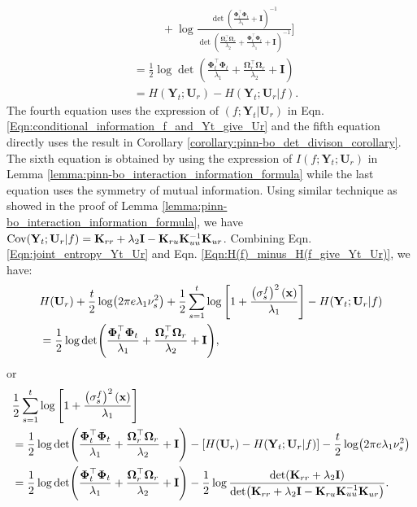 \begin{align}
\\ 
        & \;\;\; \;\;\; \;\;\;  + \log \frac{\det\left(\frac{\boldsymbol{\Phi}_t^\top \boldsymbol{\Phi}_t}{\lambda_1} + \mathbf{I}\right)^{-1}}{\det \left(\frac{\boldsymbol{\Omega}_r^\top\boldsymbol{\Omega}_r}{\lambda_2}+\frac{\boldsymbol{\Phi}_t^\top \boldsymbol{\Phi}_t} {\lambda_1} + \mathbf{I}\right)^{-1}} \Bigg] \nonumber
\\
        &=\frac{1}{2}\log \det(\frac{\boldsymbol{\Phi}_t^\top \boldsymbol{\Phi}_t}{\lambda_1} + \frac{\boldsymbol{\Omega}_r^\top \boldsymbol{\Omega}_r}{\lambda_2} + \mathbf{I}) \label{Eqn:H(f)_minus_H(f_give_Yt_Ur)}
\\
        &=
        H(\mathbf{Y}_t; \mathbf{U}_r) - H(\mathbf{Y}_t; \mathbf{U}_r \rvert f).  \nonumber
    \end{align} 
    The fourth equation uses the expression of $(f;\mathbf{Y}_t\rvert\mathbf{U}_r)$ in Eqn. \eqref{Eqn:conditional_information_f_and_Yt_give_Ur} and the fifth equation directly uses the result in Corollary \ref{corollary:pinn-bo_det_divison_corollary}.
    The sixth equation is obtained by using the expression of $I(f;\mathbf{Y}_t; \mathbf{U}_r)$  in Lemma \ref{lemma:pinn-bo_interaction_information_formula} while the last equation uses the symmetry of mutual information.
    Using similar technique as showed in the proof of Lemma \ref{lemma:pinn-bo_interaction_information_formula}, we have $\textup{Cov}(\mathbf{Y}_t; \mathbf{U}_r \rvert f) = \mathbf{K}_{rr} + \lambda_2 \mathbf{I} -  \mathbf{K}_{ru} \mathbf{K}_{uu}^{-1} \mathbf{K}_{ur}$. Combining Eqn. \eqref{Eqn:joint_entropy_Yt_Ur} and Eqn. \eqref{Eqn:H(f)_minus_H(f_give_Yt_Ur)}, we have: 
    \begin{align*}
        & H(\mathbf{U}_r) + \frac{t}{2}\log(2\pi e \lambda_1\nu_s^2) + \frac{1}{2}\sum_{s=1}^t \log \left[1+ \frac{\left(\sigma_s^f\right)^2(\mathbf{x})}{\lambda_1}\right] - H(\mathbf{Y}_t; \mathbf{U}_r \rvert f)  \notag
        \\
        &=\frac{1}{2}\log \det(\frac{\boldsymbol{\Phi}_t^\top \boldsymbol{\Phi}_t}{\lambda_1} + \frac{\boldsymbol{\Omega}_r^\top \boldsymbol{\Omega}_r}{\lambda_2} + \mathbf{I}),
    \end{align*}
    or 
    \begin{align*}
      & \frac{1}{2}\sum_{s=1}^t \log \left[1+ \frac{\left(\sigma_s^f\right)^2(\mathbf{x})}{\lambda_1}\right] \notag
      \\
      &= \frac{1}{2}\log \det(\frac{\boldsymbol{\Phi}_t^\top \boldsymbol{\Phi}_t}{\lambda_1} + \frac{\boldsymbol{\Omega}_r^\top \boldsymbol{\Omega}_r}{\lambda_2} + \mathbf{I}) - \left[H(\mathbf{U}_r) - H(\mathbf{Y}_t; \mathbf{U}_r \rvert f) \right] - \frac{t}{2}\log(2\pi e \lambda_1\nu_s^2) 
      \\
      &= \frac{1}{2}\log \det(\frac{\boldsymbol{\Phi}_t^\top \boldsymbol{\Phi}_t}{\lambda_1} + \frac{\boldsymbol{\Omega}_r^\top \boldsymbol{\Omega}_r}{\lambda_2} + \mathbf{I}) - \frac{1}{2} \log \frac{\det (\mathbf{K}_{rr} + \lambda_2\mathbf{I})}{\det(\mathbf{K}_{rr} + \lambda_2 \mathbf{I} -  \mathbf{K}_{ru} \mathbf{K}_{uu}^{-1} \mathbf{K}_{ur})}.
    \end{align*}
